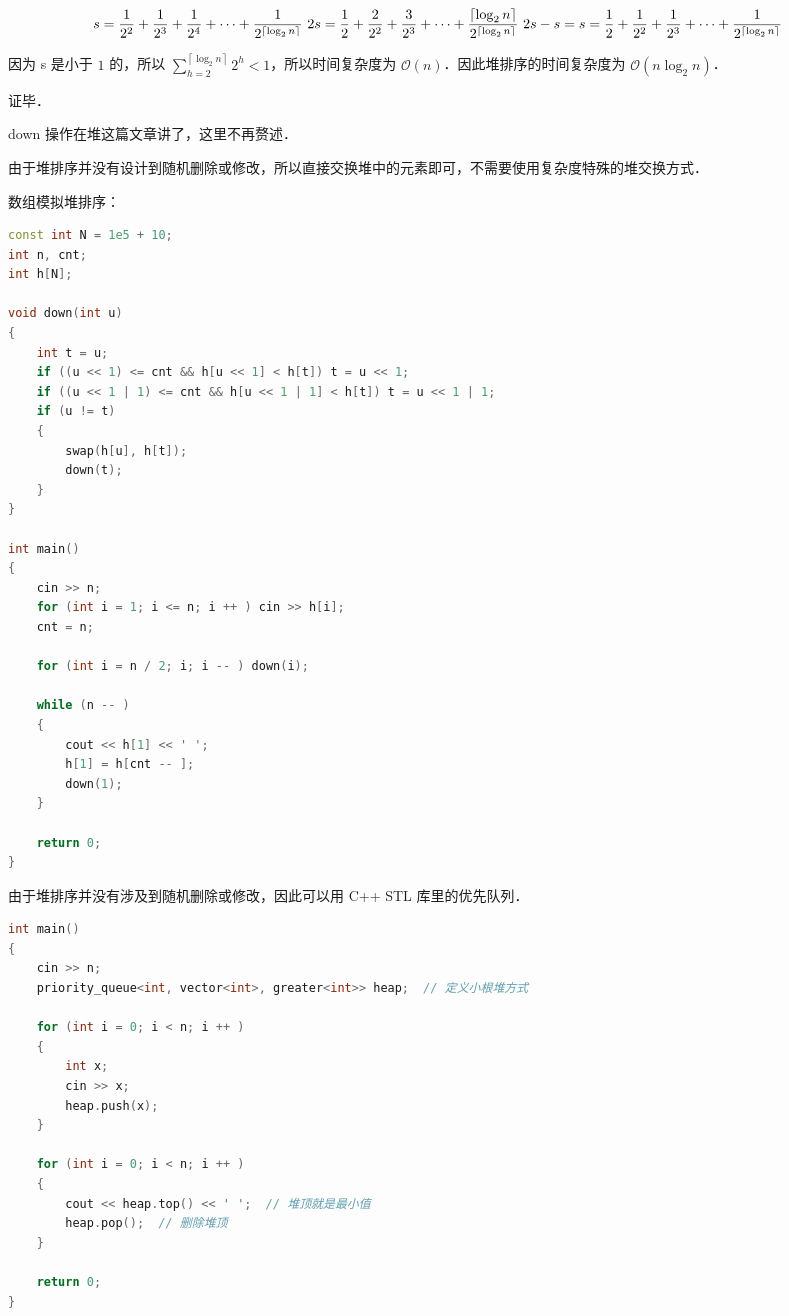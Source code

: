 \begin{equation}
s = \dfrac{1}{2^2} + \dfrac{1}{2^3} + \dfrac{1}{2^4} + \cdots +\dfrac{1}{2^{\left\lceil{\log_2 n}\right\rceil}} \\
 \ 2s = \dfrac{1}{2} + \dfrac{2}{2^2} + \dfrac{3}{2^3} + \cdots + \dfrac{\left\lceil{\log_2 n}\right\rceil}{2^{\left\lceil{\log_2 n}\right\rceil}} \\
 \ 2s - s = s= \dfrac{1}{2} + \dfrac{1}{2^2} + \dfrac{1}{2^3} + \cdots + \dfrac{1}{2^{\left\lceil{\log_2 n}\right\rceil}}
\end{equation}


因为 s 是小于 $1$ 的，所以 $\sum^{\left\lceil{\log_2 n}\right\rceil} _ {h = 2} 2^h < 1$，所以时间复杂度为 $\mathcal{O}(n)$．因此堆排序的时间复杂度为 $\mathcal{O}(n \log_2 n)$．

证毕．

down 操作在堆这篇文章讲了，这里不再赘述．

 由于堆排序并没有设计到随机删除或修改，所以直接交换堆中的元素即可，不需要使用复杂度特殊的堆交换方式．

数组模拟堆排序：
\begin{lstlisting}[language=cpp]
const int N = 1e5 + 10;
int n, cnt;
int h[N];

void down(int u)
{
    int t = u;
    if ((u << 1) <= cnt && h[u << 1] < h[t]) t = u << 1;
    if ((u << 1 | 1) <= cnt && h[u << 1 | 1] < h[t]) t = u << 1 | 1;
    if (u != t)
    {
        swap(h[u], h[t]);
        down(t);
    }
}

int main()
{
    cin >> n;
    for (int i = 1; i <= n; i ++ ) cin >> h[i];
    cnt = n;
    
    for (int i = n / 2; i; i -- ) down(i);
    
    while (n -- )
    {
        cout << h[1] << ' ';
        h[1] = h[cnt -- ];
        down(1);
    }
    
    return 0;
}
\end{lstlisting}

由于堆排序并没有涉及到随机删除或修改，因此可以用 C++ STL 库里的优先队列．

\begin{lstlisting}[language=cpp]
int main()
{
    cin >> n;
    priority_queue<int, vector<int>, greater<int>> heap;  // 定义小根堆方式
    
    for (int i = 0; i < n; i ++ )
    {
        int x;
        cin >> x;
        heap.push(x);
    }
    
    for (int i = 0; i < n; i ++ )
    {
        cout << heap.top() << ' ';  // 堆顶就是最小值
        heap.pop();  // 删除堆顶
    }
    
    return 0;
}
\end{lstlisting}
